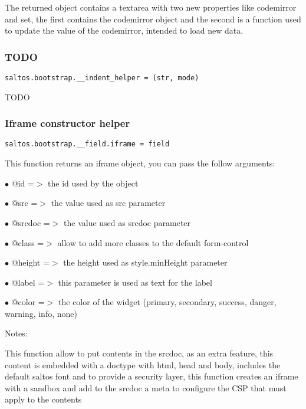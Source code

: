\documentclass[a4paper]{article}
\begin{document}
The returned object contains a textarea with two new properties like codemirror and set,
the first contains the codemirror object and the second is a function used to update the
value of the codemirror, intended to load new data.

\hypertarget{toc619}{}
\subsubsection{TODO}

\begin{lstlisting}
saltos.bootstrap.__indent_helper = (str, mode)
\end{lstlisting}

TODO

\hypertarget{toc620}{}
\subsubsection{Iframe constructor helper}

\begin{lstlisting}
saltos.bootstrap.__field.iframe = field
\end{lstlisting}

This function returns an iframe object, you can pass the follow arguments:

\begin{compactitem}
\item[\color{myblue}$\bullet$] @id     =$>$ the id used by the object
\item[\color{myblue}$\bullet$] @src    =$>$ the value used as src parameter
\item[\color{myblue}$\bullet$] @srcdoc =$>$ the value used as srcdoc parameter
\item[\color{myblue}$\bullet$] @class  =$>$ allow to add more classes to the default form-control
\item[\color{myblue}$\bullet$] @height =$>$ the height used as style.minHeight parameter
\item[\color{myblue}$\bullet$] @label  =$>$ this parameter is used as text for the label
\item[\color{myblue}$\bullet$] @color  =$>$ the color of the widget (primary, secondary, success, danger, warning, info, none)
\end{compactitem}

Notes:

This function allow to put contents in the srcdoc, as an extra feature, this content is
embedded with a doctype with html, head and body, includes the default saltos font and
to provide a security layer, this function creates an iframe with a sandbox and add to
the srcdoc a meta to configure the CSP that must apply to the contents
\end{document}
